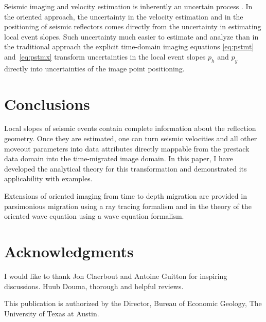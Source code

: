 Seismic imaging and velocity estimation is inherently an uncertain
process . In the oriented approach, the uncertainty in
the velocity estimation and in the positioning of seismic reflectors
comes directly from the uncertainty in estimating local event
slopes. Such uncertainty   much easier to estimate
and analyze  than in the traditional
approach  the explicit  time-domain
imaging equations  \ref{eq:pstmt} and~\ref{eq:pstmx}
  transform uncertainties in the local event slopes
$p_h$ and $p_y$ directly into uncertainties of the image point
positioning.

\section{Conclusions}

Local slopes of seismic events contain complete information about the
reflection geometry. Once they are estimated, one can turn seismic
velocities and all other moveout parameters into data attributes
directly mappable from the prestack data domain into the time-migrated
image domain. In this paper, I have developed the analytical theory
for this transformation and demonstrated its applicability with
examples.

Extensions of oriented imaging from time to depth migration are
provided in  parsimonious migration
\cite[]{GEO68-03-10431051} using a ray tracing formalism and in the
theory of the oriented wave equation \cite[]{SEG-2003-08930898} using
a wave equation formalism.

\section{Acknowledgments}

I would like to thank Jon Claerbout and Antoine Guitton for inspiring
discussions. Huub Douma,  thorough and helpful reviews.

This publication is authorized by the Director, Bureau of Economic
Geology, The University of Texas at Austin.


